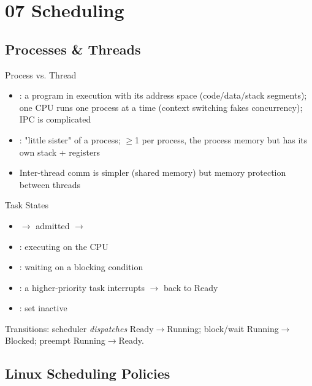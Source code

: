\section{07 Scheduling}

\subsection{Processes \& Threads}


\begin{concept}{Process vs. Thread}
    \begin{itemize}
        \item {}: a program in execution with its  address space (code/data/stack segments); one CPU runs one
              process at a time (context switching fakes concurrency); IPC is complicated
        \item {}: "little sister" of a process; $\geq$1 per process,
               the process memory but has its own stack + registers
        \item Inter-thread comm is simpler (shared memory) but  memory
              protection between threads
    \end{itemize}
\end{concept}

\begin{definition}{Task States}
    \begin{itemize}
        \item {} $\to$ admitted $\to$ 
        \item {}: executing on the CPU
        \item {}: waiting on a blocking condition
        \item {}: a higher-priority task interrupts $\to$ back to Ready
        \item {}: set inactive
    \end{itemize}
    Transitions: scheduler \emph{dispatches} Ready$\to$Running; block/wait
    Running$\to$Blocked; preempt Running$\to$Ready.
\end{definition}

\multend

\subsection{Linux Scheduling Policies}

